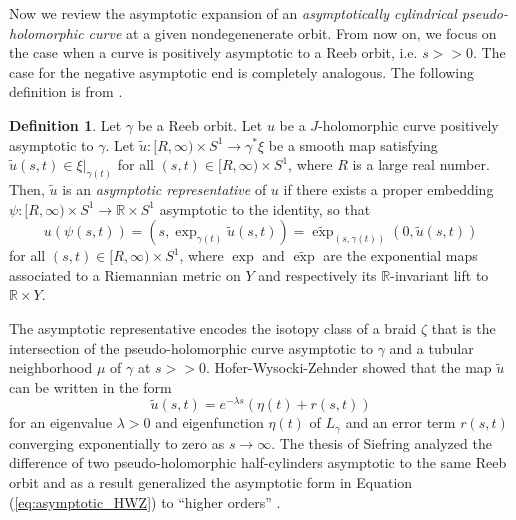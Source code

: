 \documentclass{article}
\numberwithin{equation}{section}
\theoremstyle{definition}
\newtheorem{definition}[theorem]{Definition}
\newcommand{\R}{\mathbb{R}}
\begin{document}
Now we review the asymptotic expansion of an \emph{asymptotically cylindrical pseudo-holomorphic curve} at a given nondegenenerate orbit. From now on, we focus on the case when a curve is positively asymptotic to a Reeb orbit, i.e. $s>>0$. The case for the negative asymptotic end is completely analogous. The following definition is from \cite{Siefring}.
\begin{definition}
    Let $\gamma$ be a Reeb orbit. Let $u$ be a $J$-holomorphic curve positively asymptotic to $\gamma$. Let $\widetilde{u}:[R,\infty) \times S^1 \to \gamma^*\xi$ be a smooth map satisfying $\widetilde{u}(s,t)\in \xi|_{\gamma(t)}$ for all $(s,t)\in [R, \infty) \times S^1$, where $R$ is a large real number. Then, $\widetilde{u}$ is an \emph{asymptotic representative} of $u$ if there exists a proper embedding $\psi:[R, \infty)\times S^1 \to \R \times S^1$ asymptotic to the identity, so that
    \begin{equation*}
        u(\psi(s,t)) = (s, \exp_{\gamma(t)} \widetilde{u}(s,t)) = \widetilde{\exp}_{(s, \gamma(t))}(0,\widetilde{u}(s,t))
    \end{equation*}
    for all $(s,t)\in [R, \infty) \times S^1$, where $\exp$ and $\widetilde{\exp}$ are the exponential maps associated to a Riemannian metric on $Y$ and respectively its $\R$-invariant lift to $\R \times Y$.
\end{definition}

The asymptotic representative encodes the isotopy class of a braid $\zeta$ that is the intersection of the pseudo-holomorphic curve asymptotic to $\gamma$ and a tubular neighborhood $\mu$ of $\gamma$ at $s>>0$. Hofer-Wysocki-Zehnder \cite{HWZI} showed that the map $\widetilde{u}$ can be written in the form
\begin{equation}
\label{eq:asymptotic_HWZ}
    \widetilde{u}(s,t) = e^{-\lambda s}(\eta(t) + r(s,t))
\end{equation}
for an eigenvalue $\lambda>0$ and eigenfunction $\eta(t)$ of $L_\gamma$ and an error term $r(s,t)$ converging exponentially to zero as $s\to \infty$. The thesis of Siefring analyzed the difference of two pseudo-holomorphic half-cylinders asymptotic to the same Reeb orbit and as a result generalized the asymptotic form in Equation (\ref{eq:asymptotic_HWZ}) to ``higher orders'' \cite{Siefring}.
\end{document}
